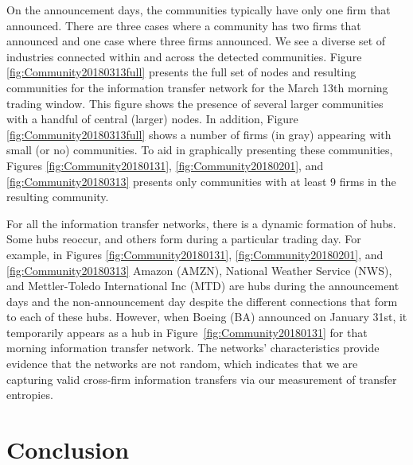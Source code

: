 On the announcement days, the communities typically have only one firm that announced.  There are three cases where a community has two firms that announced and one case where three firms announced. We see a diverse set of industries connected within and across the detected communities.   Figure \ref{fig:Community20180313full} presents the full set of nodes and resulting communities for the information transfer network for the March 13th morning trading window. This figure shows the presence of several larger communities with a handful of central (larger) nodes. In addition, Figure \ref{fig:Community20180313full} shows a number of firms (in gray) appearing with small (or no) communities.   To aid in graphically presenting these communities, Figures \ref{fig:Community20180131},  \ref{fig:Community20180201}, and \ref{fig:Community20180313}  presents only communities with at least 9 firms in the resulting community.  

For all the information transfer networks, there is a dynamic formation of hubs.  Some hubs reoccur, and others form during a particular trading day.   For example,  in Figures \ref{fig:Community20180131},  \ref{fig:Community20180201}, and \ref{fig:Community20180313} Amazon (AMZN), National Weather Service (NWS), and Mettler-Toledo International Inc (MTD) are hubs during the announcement days and the non-announcement day despite the different connections that form to each of these hubs.  However, when Boeing (BA) announced on January 31st, it temporarily appears as a hub in Figure~\ref{fig:Community20180131} for that morning information transfer network. The networks' characteristics provide evidence that the networks are not random, which indicates that we are capturing valid cross-firm information transfers via our measurement of transfer entropies. 


\section{Conclusion}

